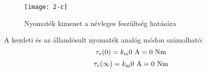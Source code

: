 \begin{figure}[H]
	\centering
	\texttt{[image: 2-c]}
	\caption{Nyomaték kimenet a névleges feszültség hatására}
	\label{fig:2-c}
\end{figure}

A kezdeti és az állandósult nyomaték analóg módon számolható:
\begin{equation}
	\tau_\text{v}(0) = k_\text{m} 0\text{ A} = 0\text{ Nm}
\end{equation}
\begin{equation}
	\tau_\text{v}(\infty) = k_\text{m} 0\text{ A} = 0\text{ Nm}
\end{equation}

